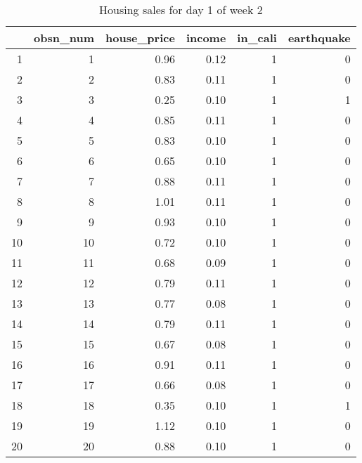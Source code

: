 \begin{table}[ht]
\centering
\begin{tabular}{rrrrrr}
  \hline
 & obsn\_num & house\_price & income & in\_cali & earthquake \\ 
  \hline
1 &   1 & 0.96 & 0.12 &   1 &   0 \\ 
  2 &   2 & 0.83 & 0.11 &   1 &   0 \\ 
  3 &   3 & 0.25 & 0.10 &   1 &   1 \\ 
  4 &   4 & 0.85 & 0.11 &   1 &   0 \\ 
  5 &   5 & 0.83 & 0.10 &   1 &   0 \\ 
  6 &   6 & 0.65 & 0.10 &   1 &   0 \\ 
  7 &   7 & 0.88 & 0.11 &   1 &   0 \\ 
  8 &   8 & 1.01 & 0.11 &   1 &   0 \\ 
  9 &   9 & 0.93 & 0.10 &   1 &   0 \\ 
  10 &  10 & 0.72 & 0.10 &   1 &   0 \\ 
  11 &  11 & 0.68 & 0.09 &   1 &   0 \\ 
  12 &  12 & 0.79 & 0.11 &   1 &   0 \\ 
  13 &  13 & 0.77 & 0.08 &   1 &   0 \\ 
  14 &  14 & 0.79 & 0.11 &   1 &   0 \\ 
  15 &  15 & 0.67 & 0.08 &   1 &   0 \\ 
  16 &  16 & 0.91 & 0.11 &   1 &   0 \\ 
  17 &  17 & 0.66 & 0.08 &   1 &   0 \\ 
  18 &  18 & 0.35 & 0.10 &   1 &   1 \\ 
  19 &  19 & 1.12 & 0.10 &   1 &   0 \\ 
  20 &  20 & 0.88 & 0.10 &   1 &   0 \\ 
   \hline
\end{tabular}
\caption{Housing sales for day 1 of week 2} 
\end{table}
